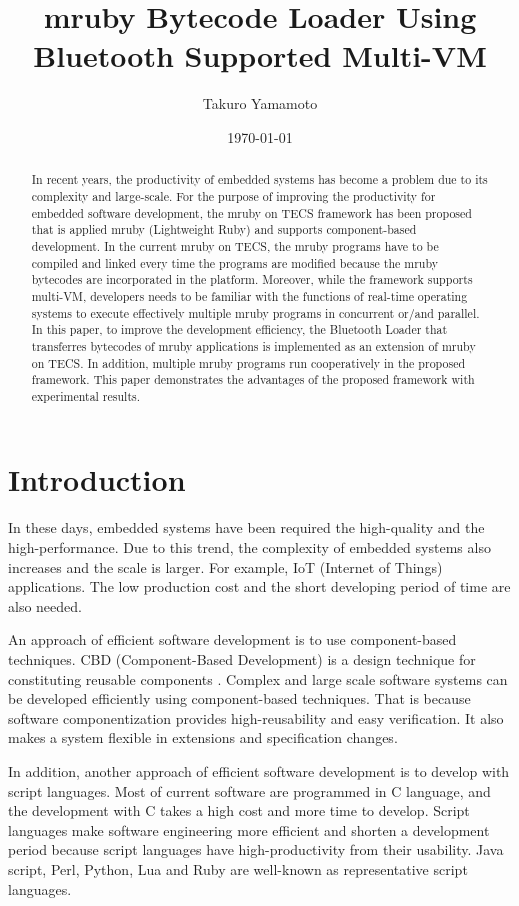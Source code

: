 \documentclass[conference,compsoc]{IEEEtran}
\title{mruby Bytecode Loader Using Bluetooth Supported Multi-VM}
\author{Takuro Yamamoto}
\date{\today}
\begin{document}
\maketitle

\begin{abstract}
In recent years, the productivity of embedded systems has become a problem due to its complexity and large-scale.
For the purpose of improving the productivity for embedded software development, the mruby on TECS framework has been proposed that is applied mruby (Lightweight Ruby) and supports component-based development.
In the current mruby on TECS, the mruby programs have to be compiled and linked every time the programs are modified because the mruby bytecodes are incorporated in the platform.
Moreover, while the framework supports multi-VM, developers needs to be familiar with the functions of real-time operating systems to execute effectively multiple mruby programs in concurrent or/and parallel.
In this paper, to improve the development efficiency, the Bluetooth Loader that transferres bytecodes of mruby applications is implemented as an extension of mruby on TECS.
In addition, multiple mruby programs run cooperatively in the proposed framework.
This paper demonstrates the advantages of the proposed framework with experimental results.
\end{abstract}
\section{Introduction}
In these days, embedded systems have been required the high-quality and the high-performance.
Due to this trend, the complexity of embedded systems also increases and the scale is larger.
For example, IoT (Internet of Things) applications.
The low production cost and the short developing period of time are also needed.

An approach of efficient software development is to use component-based techniques.
CBD (Component-Based Development) is a design technique for constituting reusable components \cite{Crnkovic:2005:CSE:1062455.1062631}.
Complex and large scale software systems can be developed efficiently using component-based techniques.
That is because software componentization provides high-reusability and easy verification.
It also makes a system flexible in extensions and specification changes.

In addition, another approach of efficient software development is to develop with script languages.
Most of current software are programmed in C language, and the development with C takes a high cost and more time to develop.
Script languages make software engineering more efficient and shorten a development period because script languages have high-productivity from their usability.
Java script, Perl, Python, Lua and Ruby are well-known as representative script languages.
\end{document}
